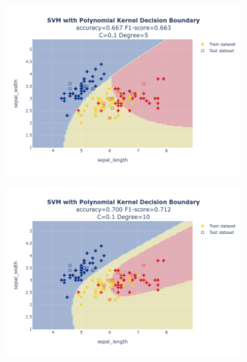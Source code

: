 \documentclass{article}
\begin{document}
\begin{figure}
\begin{subfigure}{0.3\textwidth}
        \includegraphics[scale=.13]{images/implementation/q1/polynomial_kernel/sepal_length_sepal_width_0.1_5.png}
    \end{subfigure}
    \hfill
    \begin{subfigure}{0.3\textwidth}
        \centering
        \includegraphics[scale=.13]{images/implementation/q1/polynomial_kernel/sepal_length_sepal_width_0.1_10.png}
    \end{subfigure}
    \newline
    \begin{subfigure}{0.3\textwidth}
        \centering

\end{subfigure}
\end{figure}
\end{document}
